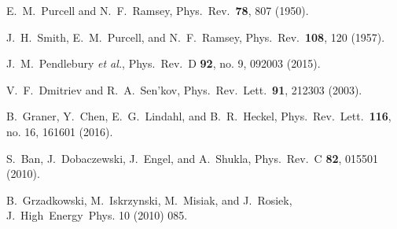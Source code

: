\documentclass[aps,prd,twocolumn,groupedaddress,showpacs,superscriptaddress,floatfix,nofootinbib,10pt]{revtex4-1}
\begin{document}
\begin{thebibliography}{}
  E.~M.~Purcell and N.~F.~Ramsey,
  Phys.\ Rev.\  {\bf 78}, 807 (1950).


  J.~H.~Smith, E.~M.~Purcell, and N.~F.~Ramsey,
  Phys.\ Rev.\  {\bf 108}, 120 (1957).


  J.~M.~Pendlebury {\it et al.},
  Phys.\ Rev.\ D {\bf 92}, no. 9, 092003 (2015).


  V.~F.~Dmitriev and R.~A.~Sen'kov,
  Phys.\ Rev.\ Lett.\  {\bf 91}, 212303 (2003).


  B.~Graner, Y.~Chen, E.~G.~Lindahl, and B.~R.~Heckel,
  Phys.\ Rev.\ Lett.\  {\bf 116}, no. 16, 161601 (2016).

  S.~Ban, J.~Dobaczewski, J.~Engel, and A.~Shukla,
  Phys.\ Rev.\ C {\bf 82}, 015501 (2010).


  B.~Grzadkowski, M.~Iskrzynski, M.~Misiak, and J.~Rosiek,
  J.\ High\ Energy\ Phys. 10 (2010) 085.



\end{thebibliography}
\end{document}

